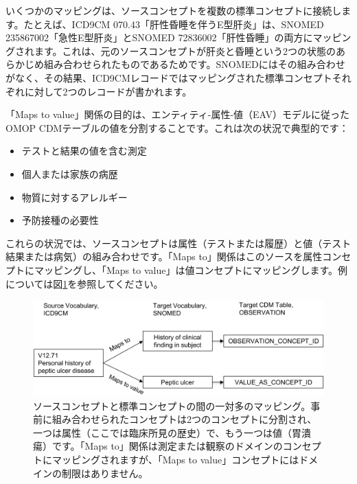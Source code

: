 \documentclass[
  11pt]{book}
\providecommand{\tightlist}{%
  \setlength{\itemsep}{0pt}\setlength{\parskip}{0pt}}
\theoremstyle{definition}
\theoremstyle{definition}
\theoremstyle{definition}
\theoremstyle{definition}
\theoremstyle{remark}
\begin{document}
いくつかのマッピングは、ソースコンセプトを複数の標準コンセプトに接続します。たとえば、ICD9CM 070.43「肝性昏睡を伴うE型肝炎」は、SNOMED 235867002「急性E型肝炎」とSNOMED 72836002「肝性昏睡」の両方にマッピングされます。これは、元のソースコンセプトが肝炎と昏睡という2つの状態のあらかじめ組み合わせられたものであるためです。SNOMEDにはその組み合わせがなく、その結果、ICD9CMレコードではマッピングされた標準コンセプトそれぞれに対して2つのレコードが書かれます。

「Maps to value」関係の目的は、エンティティ-属性-値（EAV）モデルに従ったOMOP CDMテーブルの値を分割することです。これは次の状況で典型的です：

\begin{itemize}
\tightlist
\item
  テストと結果の値を含む測定
\item
  個人または家族の病歴
\item
  物質に対するアレルギー
\item
  予防接種の必要性
\end{itemize}

これらの状況では、ソースコンセプトは属性（テストまたは履歴）と値（テスト結果または病気）の組み合わせです。「Maps to」関係はこのソースを属性コンセプトにマッピングし、「Maps to value」は値コンセプトにマッピングします。例については図\ref{fig:conceptValue}を参照してください。

\begin{figure}

{\centering \includegraphics[width=1\linewidth]{images/StandardizedVocabularies/conceptValue} 

}

\caption{ソースコンセプトと標準コンセプトの間の一対多のマッピング。事前に組み合わせられたコンセプトは2つのコンセプトに分割され、一つは属性（ここでは臨床所見の歴史）で、もう一つは値（胃潰瘍）です。「Maps to」関係は測定または観察のドメインのコンセプトにマッピングされますが、「Maps to value」コンセプトにはドメインの制限はありません。}\label{fig:conceptValue}
\end{figure}
\end{document}

